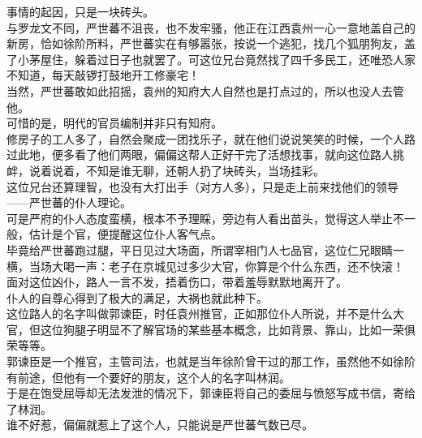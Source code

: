 \begin{multicols}{\theparacolNo}
事情的起因，只是一块砖头。\\

与罗龙文不同，严世蕃不沮丧，也不发牢骚，他正在江西袁州一心一意地盖自己的新房，恰如徐阶所料，严世蕃实在有够嚣张，按说一个逃犯，找几个狐朋狗友，盖了小茅屋住，躲着过日子也就罢了。可这位兄台竟然找了四千多民工，还唯恐人家不知道，每天敲锣打鼓地开工修豪宅！\\

当然，严世蕃敢如此招摇，袁州的知府大人自然也是打点过的，所以也没人去管他。\\

可惜的是，明代的官员编制并非只有知府。\\

修房子的工人多了，自然会聚成一团找乐子，就在他们说说笑笑的时候，一个人路过此地，便多看了他们两眼，偏偏这帮人正好干完了活想找事，就向这位路人挑衅，说着说着，不知是谁无聊，还朝人扔了块砖头，当场挂彩。\\

这位兄台还算理智，也没有大打出手（对方人多），只是走上前来找他们的领导——严世蕃的仆人理论。\\

可是严府的仆人态度蛮横，根本不予理睬，旁边有人看出苗头，觉得这人举止不一般，估计是个官，便提醒这位仆人客气点。\\

毕竟给严世蕃跑过腿，平日见过大场面，所谓宰相门人七品官，这位仁兄眼睛一横，当场大喝一声：老子在京城见过多少大官，你算是个什么东西，还不快滚！\\

面对这位凶仆，路人一言不发，捂着伤口，带着羞辱默默地离开了。\\

仆人的自尊心得到了极大的满足，大祸也就此种下。\\

这位路人的名字叫做郭谏臣，时任袁州推官，正如那位仆人所说，并不是什么大官，但这位狗腿子明显不了解官场的某些基本概念，比如背景、靠山，比如一荣俱荣等等。\\

郭谏臣是一个推官，主管司法，也就是当年徐阶曾干过的那工作，虽然他不如徐阶有前途，但他有一个要好的朋友，这个人的名字叫林润。\\

于是在饱受屈辱却无法发泄的情况下，郭谏臣将自己的委屈与愤怒写成书信，寄给了林润。\\

谁不好惹，偏偏就惹上了这个人，只能说是严世蕃气数已尽。\\


\end{multicols}
